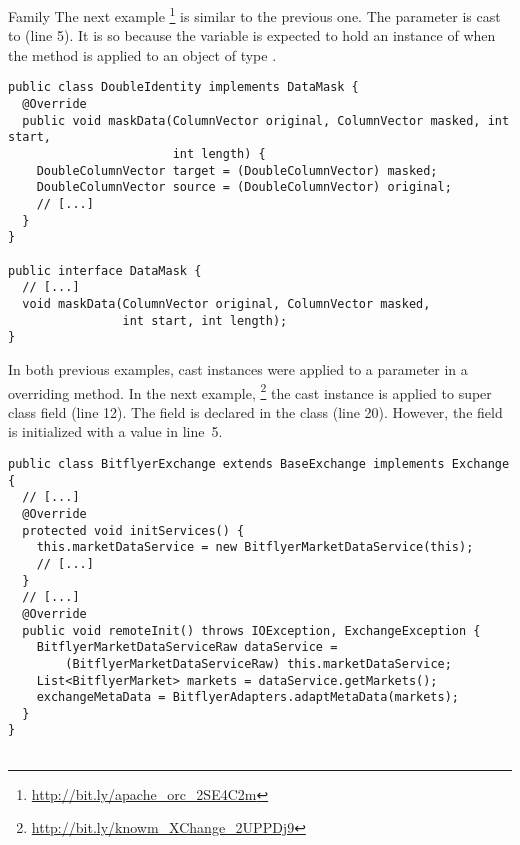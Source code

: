 \begin{pattern}{Family}
The next example%
\footnote{\url{http://bit.ly/apache_orc_2SE4C2m}}
is similar to the previous one.
The  parameter is cast to  (line 5).
It is so because the  variable is expected to hold an instance of  when the  method is applied to an object of type .

\begin{verbatim}
public class DoubleIdentity implements DataMask {
  @Override
  public void maskData(ColumnVector original, ColumnVector masked, int start,
                       int length) {
    DoubleColumnVector target = (DoubleColumnVector) masked;
    DoubleColumnVector source = (DoubleColumnVector) original;
    // [...]
  }
}

public interface DataMask {
  // [...]
  void maskData(ColumnVector original, ColumnVector masked,
                int start, int length);
}

\end{verbatim}

In both previous examples,
cast instances were applied to a parameter in a overriding method.
In the next example,%
\footnote{\url{http://bit.ly/knowm_XChange_2UPPDj9}}
the cast instance is applied to super class field (line 12).
The field is declared in the  class (line 20).
However, the field is initialized with a  value in line~5.

\begin{verbatim}
public class BitflyerExchange extends BaseExchange implements Exchange {
  // [...]
  @Override
  protected void initServices() {
    this.marketDataService = new BitflyerMarketDataService(this);
    // [...]
  }
  // [...]
  @Override
  public void remoteInit() throws IOException, ExchangeException {
    BitflyerMarketDataServiceRaw dataService =
        (BitflyerMarketDataServiceRaw) this.marketDataService;
    List<BitflyerMarket> markets = dataService.getMarkets();
    exchangeMetaData = BitflyerAdapters.adaptMetaData(markets);
  }
}


\end{verbatim}
\end{pattern}
